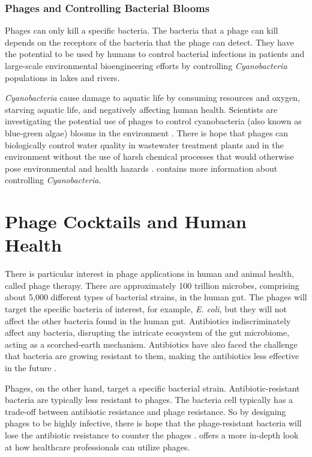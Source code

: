 \subsubsection{Phages and Controlling Bacterial Blooms}
Phages can only kill a specific bacteria. 
The bacteria that a phage can kill depends on the receptors of the bacteria that the phage can detect. 
They have the potential to be used by humans to control bacterial infections in patients and large-scale environmental bioengineering efforts by controlling \textit{Cyanobacteria} populations in lakes and rivers. 

\textit{Cyanobacteria} cause damage to aquatic life by consuming resources and oxygen, starving aquatic life, and negatively affecting human health. 
Scientists are investigating the potential use of phages to control cyanobacteria (also known as blue-green algae) blooms in the environment \cite{colomaFrequencyVirusresistantHosts2019}. 
There is hope that phages can biologically control water quality in wastewater treatment plants and in the environment without the use of harsh chemical processes that would otherwise pose environmental and health hazards \cite{krysiak-baltynSimulationPhageDynamics2017, tuckerIdentificationCyanophageMaLBP2005}. 
 contains more information about controlling \textit{Cyanobacteria}. 

\section{Phage Cocktails and Human Health}
There is particular interest in phage applications in human and animal health, called phage therapy. 
There are approximately 100 trillion microbes, comprising about 5,000 different types of bacterial strains, in the human gut. 
The phages will target the specific bacteria of interest, for example, \textit{E. coli}, but they will not affect the other bacteria found in the human gut. 
Antibiotics indiscriminately affect any bacteria, disrupting the intricate ecosystem of the gut microbiome, acting as a scorched-earth mechanism. 
Antibiotics have also faced the challenge that bacteria are growing resistant to them, making the antibiotics less effective in the future \cite{odonkorBacteriaResistanceAntibiotics2011, volkovaEffectsEarlylifePenicillin2021}. 

Phages, on the other hand, target a specific bacterial strain. 
Antibiotic-resistant bacteria are typically less resistant to phages. 
The bacteria cell typically has a trade-off between antibiotic resistance and phage resistance. 
So by designing phages to be highly infective, there is hope that the phage-resistant bacteria will lose the antibiotic resistance to counter the phages \cite{laurePhageResistancemediatedTradeoffs2022, zhaoPhagedrivenCoevolutionReveals2024}. 
 offers a more in-depth look at how healthcare professionals can utilize phages.

